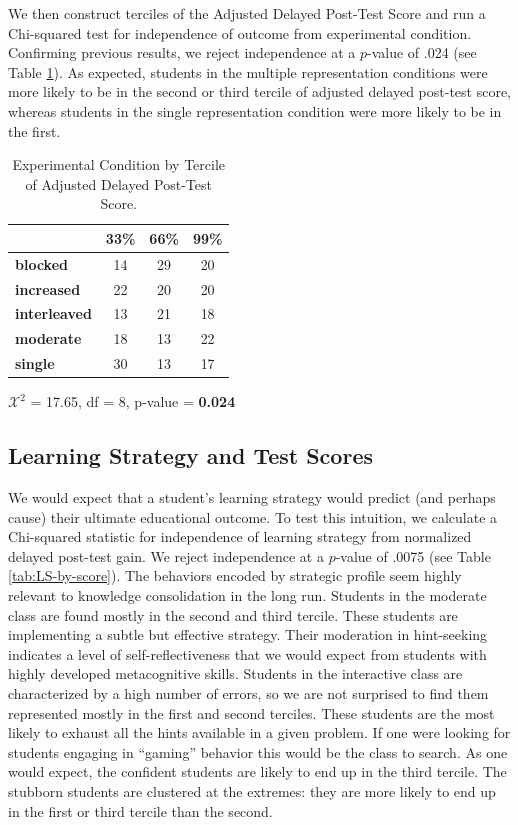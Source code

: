 \documentclass{edm_template}
\begin{document}
We then construct terciles of the Adjusted Delayed Post-Test Score and run a Chi-squared test for independence of outcome from experimental condition. Confirming previous results, we reject independence at a $p$-value of .024 (see Table \ref{tab:exp-and-score}). As expected, students in the multiple representation conditions were more likely to be in the second or third tercile of adjusted delayed post-test score, whereas students in the single representation condition were more likely to be in the first.

\begin{table}[hbtp]

\centering
\begin{tabular}{|l || c | c | c |}
\hline
&33\%&66\%&99\%\\ \hline \hline
  \textbf{blocked}  &   14& 29& 20 \\ \hline
  \textbf{increased}&   22& 20& 20 \\ \hline
\textbf{interleaved}& 13& 21& 18 \\ \hline
  \textbf{moderate} &   18& 13& 22 \\ \hline
    \textbf{single} &      30& 13& 17 \\ \hline
 \end{tabular}
  \begin{center} $\mathcal{X}^2$ = 17.65, df = 8, p-value = {\bf 0.024} \end{center}
 \caption{Experimental Condition by Tercile of Adjusted Delayed Post-Test Score.}
\label{tab:exp-and-score}
\end{table}


\subsection{Learning Strategy and Test Scores}

We would expect that a student's learning strategy would predict (and perhaps cause) their ultimate educational outcome. To test this intuition, we calculate a Chi-squared statistic for independence of learning strategy from normalized delayed post-test gain. We reject independence at a $p$-value of .0075 (see Table \ref{tab:LS-by-score}). The behaviors encoded by strategic profile seem highly relevant to knowledge consolidation in the long run. Students in the moderate class are found mostly in the second and third tercile. These students are implementing a subtle but effective strategy. Their moderation in hint-seeking indicates a level of self-reflectiveness that we would expect from students with highly developed metacognitive skills. Students in the interactive class are characterized by a high number of errors, so we are not surprised to find them represented mostly in the first and second terciles. These students are the most likely to exhaust all the hints available in a given problem. If one were looking for students engaging in ``gaming'' behavior this would be the class to search. As one would expect, the confident  students are likely to end up in the third tercile. The stubborn students are clustered at the extremes: they are more likely to end up in the first or third tercile than the second. 
\end{document}
